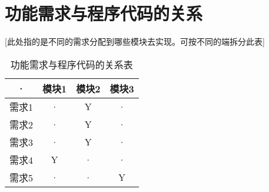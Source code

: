 \section{功能需求与程序代码的关系}
[此处指的是不同的需求分配到哪些模块去实现。可按不同的端拆分此表]
\begin{table}[htbp]
\centering
\caption{功能需求与程序代码的关系表} \label{tab:requirement-module}
\begin{tabular}{|c|c|c|c|}
    \hline
    · & 模块1 & 模块2 & 模块3 \\
    \hline
    需求1 & · & Y & · \\
    \hline
    需求2 & · & Y & · \\
    \hline
    需求3 & · & Y & · \\
    \hline
    需求4 & Y & · & · \\
    \hline
    需求5 & · & · & Y \\
    \hline
\end{tabular}
\end{table}